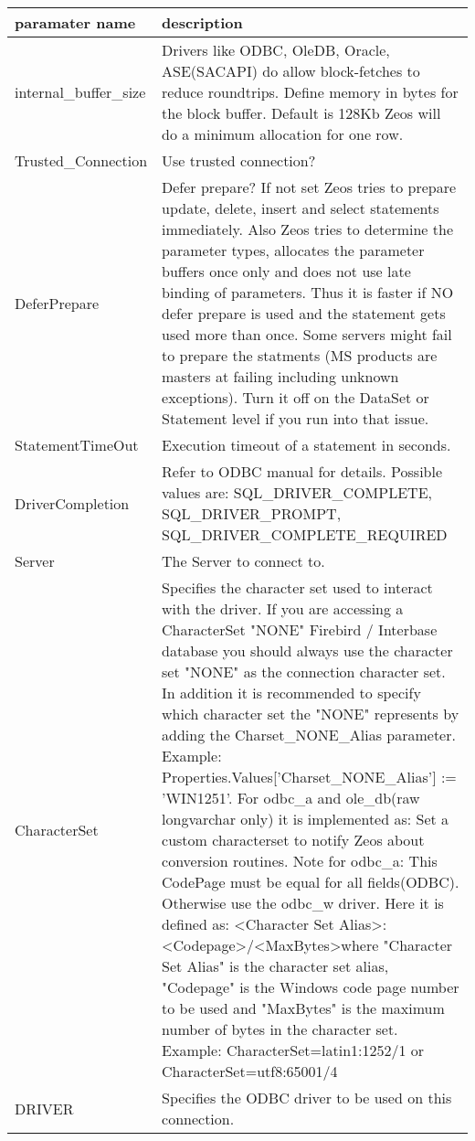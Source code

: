 \documentclass[a4paper,12pt,oneside]{article}
\begin{document}
\begin{tabularx}{\textwidth}{lX}
    paramater name & description \\ \hline
		internal\_buffer\_size & 
		  Drivers like ODBC, OleDB, Oracle, ASE(SACAPI) do allow block-fetches to reduce roundtrips.
      Define memory in bytes for the block buffer.
			Default is 128Kb
      Zeos will do a minimum allocation for one row. \\
		Trusted\_Connection &
		  Use trusted connection? \\
		DeferPrepare &
      Defer prepare? If not set Zeos tries to prepare update, delete, insert and select statements immediately.
      Also Zeos tries to determine the parameter types, allocates the parameter buffers once only and does not use late binding of parameters.
			Thus it is faster if NO defer prepare is used and the statement gets used more than once.
      Some servers might fail to prepare the statments (MS products are masters at failing including unknown exceptions).
			Turn it off on the DataSet or Statement level if you run into that issue. \\
		StatementTimeOut &
		  Execution timeout of a statement in seconds. \\
    DriverCompletion &
		   Refer to ODBC manual for details. Possible values are:
		  SQL\_DRIVER\_COMPLETE, SQL\_DRIVER\_PROMPT, SQL\_DRIVER\_COMPLETE\_REQUIRED \\
	Server &
		  The Server to connect to. \\
		CharacterSet &
		  Specifies the character set used to interact with the driver.
      If you are accessing a CharacterSet "NONE" Firebird / Interbase database you should always use the character set "NONE" as the connection character set.
			In addition it is recommended to specify which character set the "NONE" represents by adding the Charset\_NONE\_Alias parameter.
      Example: Properties.Values['Charset\_NONE\_Alias'] := 'WIN1251'.
      For odbc\_a and ole\_db(raw longvarchar only) it is implemented as:
      Set a custom characterset to notify Zeos about conversion routines.
      Note for odbc\_a: This CodePage must be equal for all fields(ODBC).
      Otherwise use the odbc\_w driver.
			Here it is defined as:
			\textless Character Set Alias\textgreater:\textless Codepage\textgreater/\textless MaxBytes\textgreater where "Character Set Alias" is the character set alias, "Codepage" is the Windows code page number to be used and "MaxBytes" is the maximum number of bytes in the character set.
			Example: CharacterSet=latin1:1252/1 or CharacterSet=utf8:65001/4 \\
		DRIVER &
		  Specifies the ODBC driver to be used on this connection. \\
\end{tabularx}
\end{document}
